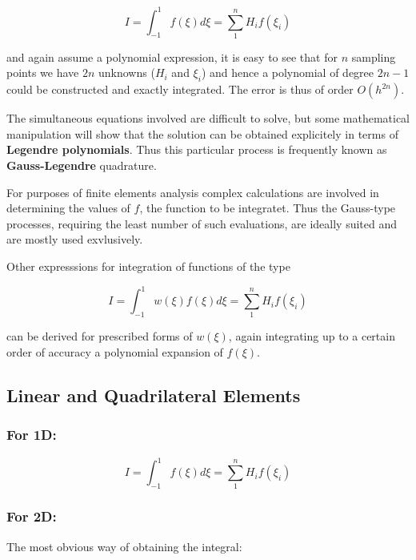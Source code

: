 \begin{equation}
    I = \int_{-1}^{1} f(\xi) d\xi = \sum_1^n H_i f(\xi_i)
\end{equation}

and again assume a polynomial expression, it is easy to see that for $ n $ sampling
points we have $ 2n $ unknowns ($H_i$ and $\xi_i$) and hence a polynomial of degree
$ 2n-1 $ could be constructed and exactly integrated. The error is thus of order
$ O(h^{2n}) $.

The simultaneous equations involved are difficult to solve, but some mathematical
manipulation will show that the solution can be obtained explicitely in terms
of \textbf{Legendre polynomials}. Thus this particular process is frequently known
as \textbf{Gauss-Legendre} quadrature.

For purposes of finite elements analysis complex calculations are involved in
determining the values of $ f $, the function to be integratet. Thus the
Gauss-type processes, requiring the least number of such evaluations, are ideally
suited and are mostly used exvlusively.

Other expresssions for integration of functions of the type

\begin{equation}\label{leggaus}
    I = \int_{-1}^{1} w(\xi) f(\xi) d\xi = \sum_{1}^{n} H_i f(\xi_i)
\end{equation}

can be derived for prescribed forms of $ w(\xi) $, again integrating up to a certain
order of accuracy a polynomial expansion of $ f(\xi) $.


\subsection{Linear and Quadrilateral Elements}

\subsubsection{For 1D:}

\begin{equation}
    I = \int_{-1}^{1} f(\xi) d\xi = \sum_1^n H_i f(\xi_i)
\end{equation}


\subsubsection{For 2D:}

The most obvious way of obtaining the integral:

